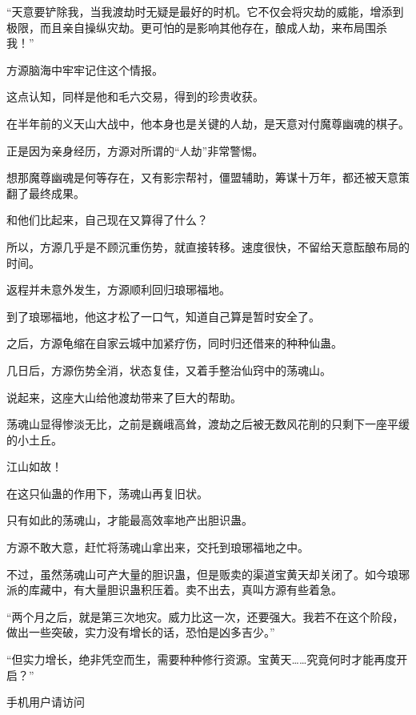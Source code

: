 \begin{this_body}
“天意要铲除我，当我渡劫时无疑是最好的时机。它不仅会将灾劫的威能，增添到极限，而且亲自操纵灾劫。更可怕的是影响其他存在，酿成人劫，来布局围杀我！”

方源脑海中牢牢记住这个情报。

这点认知，同样是他和毛六交易，得到的珍贵收获。

在半年前的义天山大战中，他本身也是关键的人劫，是天意对付魔尊幽魂的棋子。

正是因为亲身经历，方源对所谓的“人劫”非常警惕。

想那魔尊幽魂是何等存在，又有影宗帮衬，僵盟辅助，筹谋十万年，都还被天意策翻了最终成果。

和他们比起来，自己现在又算得了什么？

所以，方源几乎是不顾沉重伤势，就直接转移。速度很快，不留给天意酝酿布局的时间。

返程并未意外发生，方源顺利回归琅琊福地。

到了琅琊福地，他这才松了一口气，知道自己算是暂时安全了。

之后，方源龟缩在自家云城中加紧疗伤，同时归还借来的种种仙蛊。

几日后，方源伤势全消，状态复佳，又着手整治仙窍中的荡魂山。

说起来，这座大山给他渡劫带来了巨大的帮助。

荡魂山显得惨淡无比，之前是巍峨高耸，渡劫之后被无数风花削的只剩下一座平缓的小土丘。

江山如故！

在这只仙蛊的作用下，荡魂山再复旧状。

只有如此的荡魂山，才能最高效率地产出胆识蛊。

方源不敢大意，赶忙将荡魂山拿出来，交托到琅琊福地之中。

不过，虽然荡魂山可产大量的胆识蛊，但是贩卖的渠道宝黄天却关闭了。如今琅琊派的库藏中，有大量胆识蛊积压着。卖不出去，真叫方源有些着急。

“两个月之后，就是第三次地灾。威力比这一次，还要强大。我若不在这个阶段，做出一些突破，实力没有增长的话，恐怕是凶多吉少。”

“但实力增长，绝非凭空而生，需要种种修行资源。宝黄天……究竟何时才能再度开启？”

手机用户请访问

\end{this_body}

